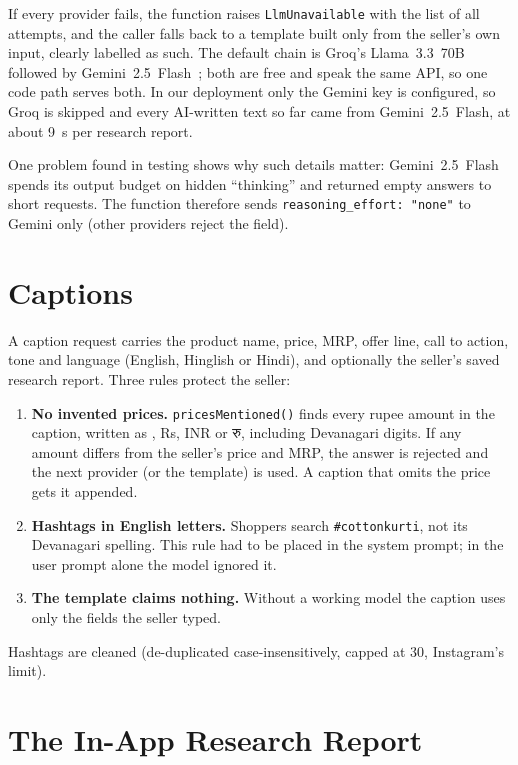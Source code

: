 \noindent If every provider fails, the function raises \texttt{LlmUnavailable} with the list of all attempts, and the caller falls back to a template built only from the seller's own input, clearly labelled as such. The default chain is Groq's Llama~3.3~70B~\cite{groq} followed by Gemini~2.5~Flash~\cite{gemini}; both are free and speak the same API, so one code path serves both. In our deployment only the Gemini key is configured, so Groq is skipped and every AI-written text so far came from Gemini~2.5~Flash, at about 9~s per research report.

One problem found in testing shows why such details matter: Gemini~2.5~Flash spends its output budget on hidden ``thinking'' and returned empty answers to short requests. The function therefore sends \texttt{reasoning\_effort: "none"} to Gemini only (other providers reject the field).

\section{Captions}

A caption request carries the product name, price, MRP, offer line, call to action, tone and language (English, Hinglish or Hindi), and optionally the seller's saved research report. Three rules protect the seller:

\begin{enumerate}
\item \textbf{No invented prices.} \texttt{pricesMentioned()} finds every rupee amount in the caption, written as \rupee, Rs, INR or {\devafont रु}, including Devanagari digits. If any amount differs from the seller's price and MRP, the answer is rejected and the next provider (or the template) is used. A caption that omits the price gets it appended.
\item \textbf{Hashtags in English letters.} Shoppers search \texttt{\#cottonkurti}, not its Devanagari spelling. This rule had to be placed in the system prompt; in the user prompt alone the model ignored it.
\item \textbf{The template claims nothing.} Without a working model the caption uses only the fields the seller typed.
\end{enumerate}
\noindent Hashtags are cleaned (de-duplicated case-insensitively, capped at 30, Instagram's limit).

\section{The In-App Research Report}
\label{sec:research}

